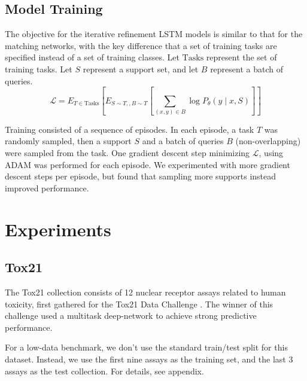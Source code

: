 \documentclass[journal=jacsat,manuscript=article]{achemso}
\begin{document}
\subsection{Model Training}
The objective for the iterative refinement LSTM models is similar to that for the matching networks, with the key difference that a set of training tasks are specified instead of a set of training classes. Let $\text{Tasks}$ represent the set of training tasks. Let $S$ represent a support set, and let $B$ represent a batch of queries.
\[
\mathcal{L} = E_{T\in\text{Tasks}} \left [ E_{S\sim T,, B\sim T} \left [ \sum_{(x,y) \in B} \log P_\theta(y\mid x, S) \right ] \right ]
\]

 Training consisted of a sequence of episodes. In each episode, a task $T$ was randomly sampled, then a support $S$ and a batch of queries $B$ (non-overlapping) were sampled from the task. One gradient descent step minimizing $\mathcal{L}$, using ADAM \cite{kingma2014adam} was performed for each episode. We experimented with more gradient descent steps per episode, but found that sampling more supports instead improved performance.
\section{Experiments}
\subsection{Tox21}
The Tox21 collection consists of 12 nuclear receptor assays related to human toxicity, first gathered for the Tox21 Data Challenge \cite{tox21}. The winner of this challenge used a multitask deep-network \cite{unterthiner2015toxicity} to achieve strong predictive performance.

For a low-data benchmark, we don't use the standard train/test split for this dataset. Instead, we use the first nine assays as the training set, and the last 3 assays as the test collection. For details, see appendix.
\end{document}
